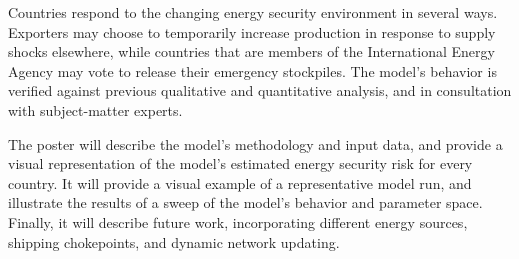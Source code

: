 \documentclass{article}
\begin{document}
Countries respond to the changing energy security environment in several ways. Exporters may choose to temporarily increase production in response to supply shocks elsewhere, while countries that are members of the International Energy Agency may vote to release their emergency stockpiles. The model's behavior is verified against previous qualitative and quantitative analysis, and in consultation with subject-matter experts. 

The poster will describe the model's methodology and input data, and provide a visual representation of the model's estimated energy security risk for every country. It will provide a visual example of a representative model run, and illustrate the results of a sweep of the model's behavior and parameter space. Finally, it will describe future work, incorporating different energy sources, shipping chokepoints, and dynamic network updating.

 

\end{document}
